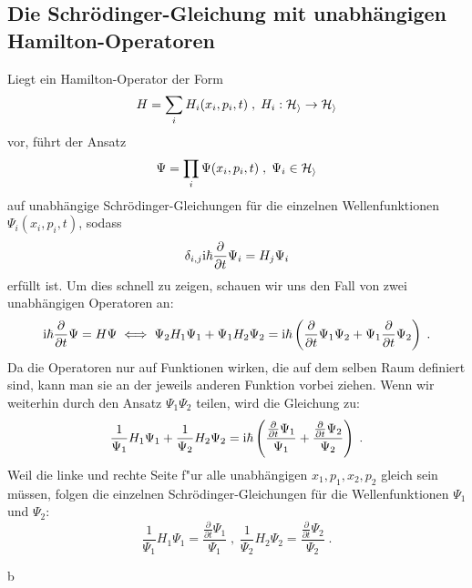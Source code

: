   \subsection{Die Schrödinger-Gleichung mit unabhängigen Hamilton-Operatoren}
    Liegt ein Hamilton-Operator der Form
    \begin{equation}
      H = \sum_i H_i(x_i,p_i,t) \;,\; H_i : \cal H_i \rightarrow H_i
    \end{equation}
    vor, führt der Ansatz
    \begin{equation}
      \Psi = \prod_i \Psi(x_i,p_i,t) \; , \; \Psi_i \in \cal H_i
    \end{equation}
    auf unabhängige Schrödinger-Gleichungen für die einzelnen Wellenfunktionen \\ $\Psi_i(x_i,p_i,t)$, sodass \cite{online quelle}
    \begin{equation}
      \delta_{i,j} \text i \hbar \frac{\partial}{\partial t}\Psi_i = H_j \Psi_i
    \end{equation}
    erfüllt ist.
    Um dies schnell zu zeigen, schauen wir uns den Fall von zwei unabhängigen Operatoren an:
    \begin{align}
      \begin{split}
        \text i \hbar \frac{\partial}{\partial t} \Psi = H\Psi \iff \Psi_2 H_1 \Psi_1 + \Psi_1 H_2 \Psi_2 = \text i \hbar \left(\frac{\partial}{\partial t} \Psi_1\Psi_2 + \Psi_1\frac{\partial}{\partial t} \Psi_2 \right) \; .
      \end{split}
    \end{align}
    Da die Operatoren nur auf Funktionen wirken, die auf dem selben Raum definiert sind, kann man sie an der jeweils anderen Funktion vorbei ziehen.
    Wenn wir weiterhin durch den Ansatz $\Psi_1\Psi_2$ teilen, wird die Gleichung zu:
    \begin{equation}
      \frac{1}{\Psi_1}H_1\Psi_1 + \frac{1}{\Psi_2}H_2\Psi_2 = \text i \hbar \left(\frac{\frac{\partial}{\partial t} \Psi_1}{\Psi_1} + \frac{\frac{\partial}{\partial t} \Psi_2}{\Psi_2} \right) \; .
    \end{equation}
    Weil die linke und rechte Seite f"ur alle unabhängigen $x_1,p_1,x_2,p_2$ gleich sein müssen, folgen die einzelnen Schrödinger-Gleichungen für die Wellenfunktionen $\Psi_1$ und $\Psi_2$:
    \begin{equation}
      \frac{1}{\Psi_1}H_1\Psi_1 = \frac{\frac{\partial}{\partial t} \Psi_1}{\Psi_1} \; , \; \frac{1}{\Psi_2}H_2\Psi_2 = \frac{\frac{\partial}{\partial t} \Psi_2}{\Psi_2} \; .
    \end{equation}
































   b
